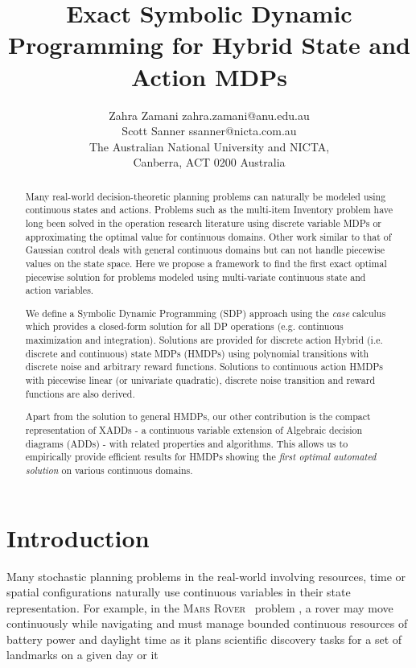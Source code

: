 \documentclass[twoside,11pt]{article}
\newcommand{\MarsRover}{\textsc{Mars Rover }}
\begin{document}
\title{Exact Symbolic Dynamic Programming for Hybrid State and Action MDPs}

\author{\name Zahra Zamani \email zahra.zamani@anu.edu.au \\
       \name Scott Sanner \email ssanner@nicta.com.au \\
       \addr The Australian National University and NICTA,\\
       Canberra, ACT 0200 Australia       
}

\maketitle


\begin{abstract}
Many real-world decision-theoretic planning problems can naturally be modeled using continuous states and actions. Problems such as the multi-item Inventory problem \cite{Scarf_Karlin58} have long been solved in the operation research literature using discrete variable MDPs or approximating the optimal value for continuous domains. Other work similar to that of Gaussian control deals with general continuous domains but can not handle piecewise values on the state space. Here we propose a framework to find the first exact optimal piecewise solution for problems modeled using multi-variate continuous state and action variables.

We define a Symbolic Dynamic Programming (SDP) approach using the \emph{case} calculus which provides a closed-form solution for all DP operations (e.g. continuous maximization and integration). Solutions are provided for discrete action Hybrid (i.e. discrete and continuous) state MDPs (HMDPs) using polynomial transitions with discrete noise and arbitrary reward functions. Solutions to continuous action HMDPs with piecewise linear (or univariate quadratic), discrete noise transition and reward functions are also derived. 

Apart from the solution to general HMDPs, our other contribution is the compact representation of XADDs - a continuous variable extension of Algebraic decision diagrams (ADDs) - with related properties and algorithms. This allows us to empirically provide efficient results for HMDPs showing the \emph{first optimal automated solution} on various continuous domains. 
\end{abstract}

\section{Introduction}
\label{Introduction}
Many stochastic planning problems in the real-world involving resources, time or spatial configurations naturally use continuous variables in their state representation.  For example, in the \MarsRover\ problem \cite{bresina02}, a rover may move continuously while navigating and must manage bounded continuous resources of battery power and daylight time as it plans scientific discovery tasks for a set of landmarks on a given day or it  
\end{document}
